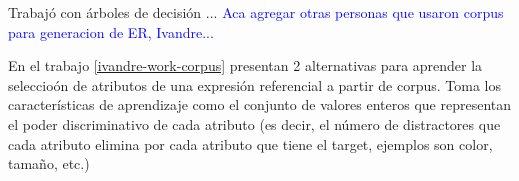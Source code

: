 Trabaj\'o con \'arboles de decisi\'on ...
\textcolor{blue}{Aca agregar otras personas que usaron corpus para generacion de ER, Ivandre... }

En el trabajo \ref{ivandre-work-corpus} presentan 2 alternativas para aprender la seleccio\'on de atributos de una expresi\'on referencial a partir de corpus. Toma los caracter\'isticas de aprendizaje como el conjunto de valores enteros que representan el poder discriminativo de cada atributo (es decir, el n\'umero de distractores que cada atributo elimina por cada atributo que tiene el target, ejemplos son color, tama\~no, etc.) 

